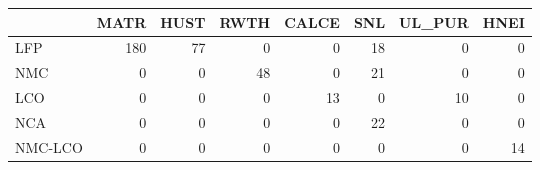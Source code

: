 \begin{tabular}{lrrrrrrr}
\toprule
 & MATR & HUST & RWTH & CALCE & SNL & UL_PUR & HNEI \\
\midrule
LFP & 180 & 77 & 0 & 0 & 18 & 0 & 0 \\
NMC & 0 & 0 & 48 & 0 & 21 & 0 & 0 \\
LCO & 0 & 0 & 0 & 13 & 0 & 10 & 0 \\
NCA & 0 & 0 & 0 & 0 & 22 & 0 & 0 \\
NMC-LCO & 0 & 0 & 0 & 0 & 0 & 0 & 14 \\
\bottomrule
\end{tabular}
